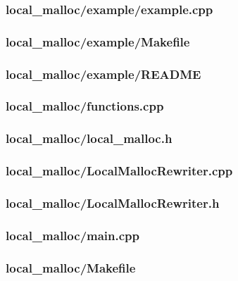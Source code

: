 \documentclass{article}
\begin{document}
\subsubsection*{local\_malloc/example/example.cpp}


\subsubsection*{local\_malloc/example/Makefile}


\subsubsection*{local\_malloc/example/README}


\subsubsection*{local\_malloc/functions.cpp}


\subsubsection*{local\_malloc/local\_malloc.h}


\subsubsection*{local\_malloc/LocalMallocRewriter.cpp}


\subsubsection*{local\_malloc/LocalMallocRewriter.h}


\subsubsection*{local\_malloc/main.cpp}


\subsubsection*{local\_malloc/Makefile}

\end{document}
